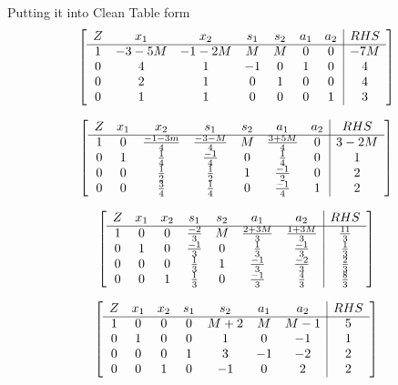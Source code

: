 \documentclass[10pt, letterpaper]{paper}
\begin{document}
Putting it into Clean Table form
\[
	\left[ {\begin{array}{ccccccc|c}
	Z & x_1 & x_2 & s_1 & s_2 & a_1 & a_2 & RHS\\ \cline{1-8}
	1 & -3 - 5M & -1 - 2M & M & M & 0 & 0 &-7M \\
	0 & 4 & 1 & -1 & 0 & 1 & 0 & 4 \\
	0 & 2 & 1 & 0 & 1 & 0 & 0 & 4 \\
	0 & 1 & 1 & 0 & 0 & 0 & 1 & 3  \\
	\end{array} } \right]
\]

\[
	\left[ {\begin{array}{ccccccc|c}
	Z & x_1 & x_2 & s_1 & s_2 & a_1 & a_2 & RHS\\ \cline{1-8}
	1 & 0 & \frac{-1 - 3m}{4} & \frac{-3-M}{4} & M & \frac{3+5M}{4} & 0 &3-2M \\
	0 & 1 & \frac{1}{4} & \frac{-1}{4} & 0 & \frac{1}{4} & 0 & 1 \\
	0 & 0 & \frac{1}{2} & \frac{1}{2} & 1 & \frac{-1}{2} & 0 & 2  \\
	0 & 0 & \frac{3}{4} & \frac{1}{4} & 0 & \frac{-1}{4} & 1 & 2  \\
	\end{array} } \right]
\]

\[
	\left[ {\begin{array}{ccccccc|c}
	Z & x_1 & x_2 & s_1 & s_2 & a_1 & a_2 & RHS\\ \cline{1-8}
	1 & 0 & 0 & \frac{-2}{3} & M & \frac{2+3M}{3} & \frac{1+3M}{3} & \frac{11}{3} \\
	0 & 1 & 0 & \frac{-1}{3} & 0 & \frac{1}{3} & \frac{-1}{3} & \frac{1}{3} \\
	0 & 0 & 0 & \frac{1}{3} & 1 & \frac{-1}{3} & \frac{-2}{3} & \frac{2}{3}  \\
	0 & 0 & 1 & \frac{1}{3} & 0 & \frac{-1}{3} & \frac{4}{3} & \frac{8}{3}  \\
	\end{array} } \right]
\]


\[
	\left[ {\begin{array}{ccccccc|c}
	Z & x_1 & x_2 & s_1 & s_2 & a_1 & a_2 & RHS\\ \cline{1-8}
	1 & 0 & 0 & 0 & M+ 2 & M & M - 1 & 5 \\
	0 & 1 & 0 & 0 & 1 & 0 & -1 & 1 \\
	0 & 0 & 0 & 1 & 3 & -1 & -2 & 2  \\
	0 & 0 & 1 & 0 & -1 & 0 & 2 & 2  \\
	\end{array} } \right]
\]
\end{document}
